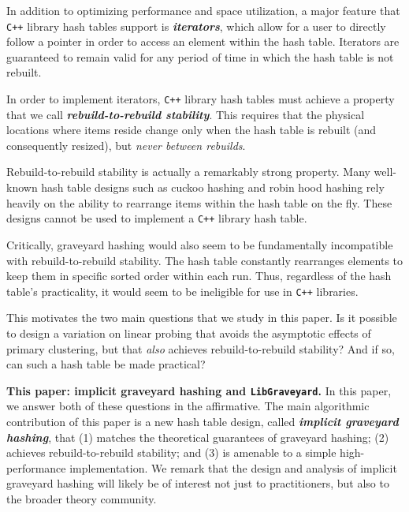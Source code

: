\documentclass[10pt]{article}
\theoremstyle{remark}
\theoremstyle{remark}
\newcommand{\defn}[1]{\textbf{\emph{#1}}}
\renewcommand{\paragraph}[1]{\vspace{.2 cm} \noindent \textbf{#1}}
\begin{document}
In addition to optimizing performance and space utilization, a major feature that \texttt{C++} library hash tables support is \defn{iterators}, which allow for a user to directly follow a pointer in order to access an element within the hash table. Iterators are guaranteed to remain valid for any period of time in which the hash table is not rebuilt. 

In order to implement iterators, \texttt{C++} library hash tables must achieve a property that we call \defn{rebuild-to-rebuild stability}. This requires that the physical locations where items reside change only when the hash table is rebuilt (and consequently resized), but \emph{never between rebuilds}. 

Rebuild-to-rebuild stability is actually a remarkably strong property. Many well-known hash table designs such as cuckoo hashing \cite{..} and robin hood hashing \cite{...} rely heavily on the ability to rearrange items within the hash table on the fly. These designs cannot be used to implement a \texttt{C++} library hash table. 

Critically, graveyard hashing would also seem to be fundamentally incompatible with rebuild-to-rebuild stability. The hash table constantly rearranges elements to keep them in specific sorted order within each run. Thus, regardless of the hash table's practicality, it would seem to be ineligible for use in \texttt{C++} libraries.

This motivates the two main questions that we study in this paper. Is it possible to design a variation on linear probing that avoids the asymptotic effects of primary clustering, but that \emph{also} achieves rebuild-to-rebuild stability? And if so, can such a hash table be made practical?


\paragraph{This paper: implicit graveyard hashing and \texttt{LibGraveyard}.} 
In this paper, we answer both of these questions in the affirmative. 
The main algorithmic contribution of this paper is a new hash table design, called \defn{implicit graveyard hashing}, that (1) matches the theoretical guarantees of graveyard hashing; (2) achieves rebuild-to-rebuild stability; and (3) is amenable to a simple high-performance implementation. We remark that the design and analysis of implicit graveyard hashing will likely be of interest not just to practitioners, but also to the broader theory community.
\end{document}
